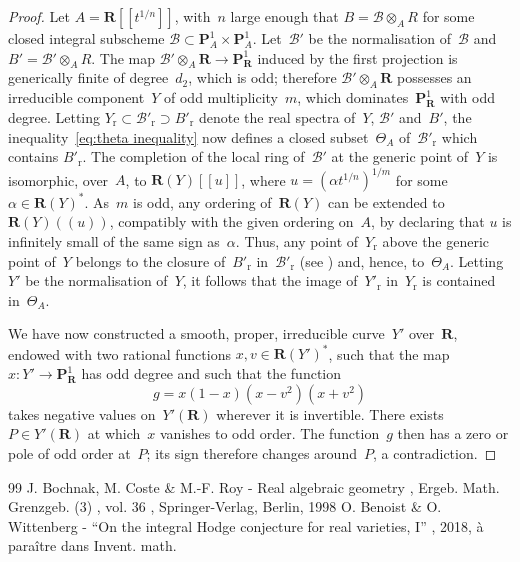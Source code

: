 \documentclass[11pt]{article}
\newcommand{\lpr}{(\!(}
\newcommand{\rpr}{)\!)}
\newcommand{\lcr}{[\![}
\newcommand{\rcr}{]\!]}
\theoremstyle{plain}
\theoremstyle{definition}
\numberwithin{equation}{section}
\newcommand{\rs}{{\mathrm{r}}}
\newcommand{\sB}{{\mathscr B}}
\renewcommand{\P}{{\mathbf P}}
\newcommand{\R}{{\mathbf R}}
\begin{document}
\begin{proof}
Let $A=\R\lcr t^{1/n}\rcr$, with~$n$ large enough that
$B=\sB\otimes_A R$ for some closed integral
subscheme $\sB \subset \P^1_A \times \P^1_A$.
Let~$\sB'$ be the normalisation of~$\sB$ and $B'=\sB'\otimes_AR$.
The map $\sB'\otimes_A \R \to \P^1_\R$ induced by the first projection
is generically finite of degree~$d_2$, which is odd;
therefore $\sB' \otimes_A \R$ possesses an irreducible component~$Y$ of odd multiplicity~$m$,
which dominates~$\P^1_\R$ with odd degree.
Letting $Y_\rs \subset \sB'_\rs \supset B'_\rs$ denote the real spectra of~$Y$, $\sB'$
and~$B'$,
the inequality~\eqref{eq:theta inequality} now defines a closed subset~$\Theta_A$ of~$\sB'_\rs$
which contains $B'_\rs$.
The completion of the local ring of~$\sB'$ at the generic point of~$Y$ is isomorphic,
over~$A$, to $\R(Y)\lcr u\rcr$, where $u=(\alpha t^{1/n})^{1/m}$ for some $\alpha \in \R(Y)^*$.
As~$m$ is odd,
any ordering of~$\R(Y)$ can be extended to $\R(Y)\lpr u\rpr$, compatibly with the given ordering on~$A$,
by declaring that $u$ is infinitely small of the same sign as~$\alpha$.
Thus, any point of~$Y_\rs$ above the generic point of~$Y$ belongs to the closure of~$B'_\rs$ in~$\sB'_\rs$
(see \cite[Prop.\,7.1.21]{bcr}) and, hence, to~$\Theta_A$.
Letting~$Y'$ be the normalisation of~$Y$, it follows that the image of~$Y'_\rs$ in~$Y_\rs$
is contained in~$\Theta_A$.

We have now constructed a smooth, proper, irreducible curve~$Y'$ over~$\R$, endowed with two rational
functions $x,v \in \R(Y')^*$, such that the map $x:Y'\to \P^1_\R$ has odd degree and such that
the function
\[
g=x(1-x)(x-v^2)(x+v^2)
\]
takes negative values on~$Y'(\R)$
wherever it is invertible.
There exists $P \in Y'(\R)$ at which~$x$ vanishes to odd order.
The function~$g$ then has a zero or pole of odd order at~$P$; its
sign therefore changes around~$P$, a contradiction.
\end{proof}


\begin{thebibliography}{99}
 J. Bochnak, M. Coste \& M.-F. Roy - Real algebraic geometry , Ergeb. Math. Grenzgeb. (3) , vol. 36 , Springer-Verlag, Berlin, 1998
 O. Benoist \& O. Wittenberg - “On the integral Hodge conjecture for real varieties, I” , 2018, à paraître dans Invent. math.
\end{thebibliography}
\end{document}
